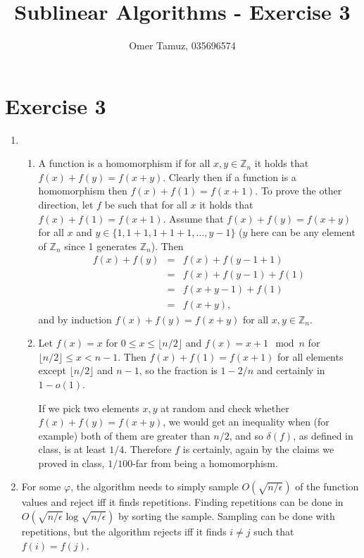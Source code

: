 \documentclass[11pt]{article} \usepackage{amssymb}
\newcommand{\Z}{\mathbb Z} \newcommand{\CalE}{{\mathcal{E}}}
\renewcommand{\phi}{\varphi}
\begin{document}
\title{Sublinear Algorithms - Exercise 3}

 \author{Omer Tamuz, 035696574}
\maketitle

\section{Exercise 3}
\begin{enumerate}
\item 
  \begin{enumerate}
  \item A function is a homomorphism if for all $x,y\in \Z_n$ it holds that 
    $f(x)+f(y)=f(x+y)$. Clearly then if a function is a homomorphism then
    $f(x)+f(1)=f(x+1)$. To prove the other direction, let $f$ be such that
    for all $x$ it holds that $f(x)+f(1)=f(x+1)$. Assume that 
    $f(x)+f(y)=f(x+y)$ for all $x$ and $y\in\{1,1+1,1+1+1,\ldots,y-1\}$ 
    ($y$ here can be any element of $\Z_n$ since 1 generates $\Z_n$). Then
    \begin{eqnarray*}
      f(x)+f(y)&=&f(x)+f(y-1+1)
      \\ &=& f(x)+f(y-1)+f(1)
      \\ &=& f(x+y-1)+f(1)
      \\ &=& f(x+y),
    \end{eqnarray*}
    and by induction $f(x)+f(y)=f(x+y)$ for all $x,y\in \Z_n$.
  \item
    Let $f(x)=x$ for $0\leq x\leq \lfloor n/2\rfloor$ and  
    $f(x)=x+1\mod n$ for $\lfloor n/2\rfloor\leq x < n-1$. Then $f(x)+f(1)=f(x+1)$ for all elements
    except $\lfloor n/2\rfloor$ and $n-1$, so the fraction is $1-2/n$ and certainly in
    $1-o(1)$. 

    If we pick two elements $x,y$  at random and check whether 
    $f(x)+f(y)=f(x+y)$, we would get an inequality when (for example) both
    of them are greater than $n/2$, and 
    so $\delta(f)$,  as defined in class, is at least $1/4$. 
    Therefore $f$ is certainly, again by 
    the claims we proved in class,  $1/100$-far from  being a homomorphism.
  \end{enumerate}
\item For some $\phi$, the algorithm needs to simply sample $O(\sqrt{n/\epsilon})$ 
  of the function
  values and reject iff it finds repetitions. Finding repetitions can be done in
  $O(\sqrt{n/\epsilon}\log \sqrt{n/\epsilon})$ by sorting the sample. Sampling can be done with repetitions,
  but the algorithm rejects iff it finds $i\neq j$ such that $f(i)=f(j)$.


\end{enumerate}
\end{document}
